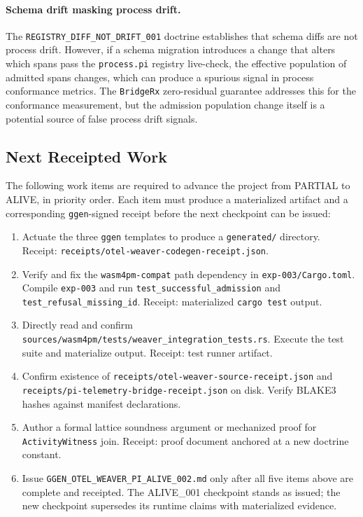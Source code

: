 \paragraph{Schema drift masking process drift.}
The \texttt{REGISTRY\_DIFF\_NOT\_DRIFT\_001} doctrine establishes that schema diffs are not
process drift. However, if a schema migration introduces a change that alters which spans pass
the \texttt{process.pi} registry live-check, the effective population of admitted spans changes,
which can produce a spurious signal in process conformance metrics. The \texttt{BridgeRx}
zero-residual guarantee addresses this for the conformance measurement, but the admission
population change itself is a potential source of false process drift signals.

\subsection{Next Receipted Work}
\label{sec:otel-weaver-open-next}

The following work items are required to advance the project from PARTIAL to ALIVE, in priority
order. Each item must produce a materialized artifact and a corresponding \texttt{ggen}-signed
receipt before the next checkpoint can be issued:

\begin{enumerate}
  \item Actuate the three \texttt{ggen} templates to produce a \texttt{generated/} directory.
    Receipt: \texttt{receipts/otel-weaver-codegen-receipt.json}.
  \item Verify and fix the \texttt{wasm4pm-compat} path dependency in \texttt{exp-003/Cargo.toml}.
    Compile \texttt{exp-003} and run \texttt{test\_successful\_admission} and
    \texttt{test\_refusal\_missing\_id}. Receipt: materialized \texttt{cargo test} output.
  \item Directly read and confirm \texttt{sources/wasm4pm/tests/weaver\_integration\_tests.rs}.
    Execute the test suite and materialize output. Receipt: test runner artifact.
  \item Confirm existence of \texttt{receipts/otel-weaver-source-receipt.json} and
    \texttt{receipts/pi-telemetry-bridge-receipt.json} on disk. Verify BLAKE3 hashes
    against manifest declarations.
  \item Author a formal lattice soundness argument or mechanized proof for
    \texttt{ActivityWitness} join. Receipt: proof document anchored at a new doctrine constant.
  \item Issue \texttt{GGEN\_OTEL\_WEAVER\_PI\_ALIVE\_002.md} only after all five items above
    are complete and receipted. The ALIVE\_001 checkpoint stands as issued; the new checkpoint
    supersedes its runtime claims with materialized evidence.
\end{enumerate}

